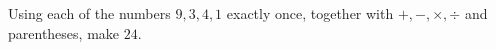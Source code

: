 Using each of the numbers $9,3,4,1$ exactly once, together with $+,-,\times,\div$ and parentheses, make $24$.
